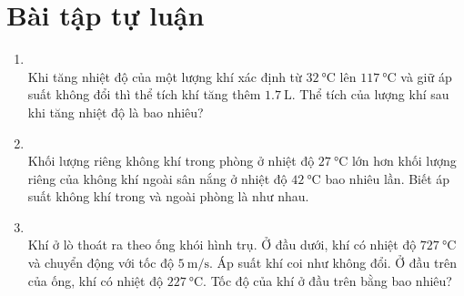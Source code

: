 \section{Bài tập tự luận}
\begin{enumerate}[label=\bfseries Câu \arabic*:, leftmargin=1.7cm]
	
	\item{}\\
	Khi tăng nhiệt độ của một lượng khí xác định từ $\SI{32}{\celsius}$ lên $\SI{117}{\celsius}$ và giữ áp suất không đổi thì thể tích khí tăng thêm $\SI{1.7}{\liter}$. Thể tích của lượng khí sau khi tăng nhiệt độ là bao nhiêu?

\item {}\\
Khối lượng riêng không khí trong phòng ở nhiệt độ $\SI{27}{\celsius}$ lớn hơn khối lượng riêng của không khí ngoài sân nắng ở nhiệt độ $\SI{42}{\celsius}$ bao nhiêu lần. Biết áp suất không khí trong và ngoài phòng là như nhau.

\item {}\\
Khí ở lò thoát ra theo ống khói hình trụ. Ở đầu dưới, khí có nhiệt độ $\SI{727}{\celsius}$ và chuyển động với tốc độ $\SI{5}{\meter/\second}$. Áp suất khí coi như không đổi. Ở đầu trên của ống, khí có nhiệt độ $\SI{227}{\celsius}$. Tốc độ của khí ở đầu trên bằng bao nhiêu?
\end{enumerate}



